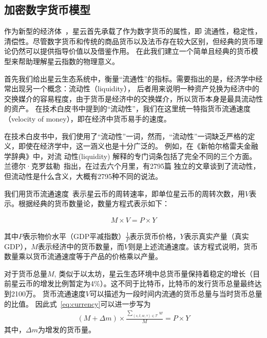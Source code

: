 \subsection{加密数字货币模型}

作为新型的经济体~\cite{neweco}，星云首先承载了作为数字货币的属性，即{\color{red} 流通性，稳定性，清偿性}。尽管数字货币和传统的商品货币以及法币存在较大区别，但经典的货币理论仍然可以提供指导价值以及借鉴作用。
在此我们建立一个简单且经典的货币模型来帮助理解星云指数的物理意义。

首先我们给出星云生态系统中，衡量“流通性”的指标。需要指出的是，经济学中经常出现另一个概念：流动性（liquidity），
后者用来说明一种资产兑换为经济中的交换媒介的容易程度，由于货币是经济中的交换媒介，所以货币本身是最具流动性的资产。
在技术白皮书中提到的“流动性”，我们在这里统一特指货币流通速度（velocity of money），即在经济中货币易手的速度。

{\color{gray} 在技术白皮书中，我们使用了``流动性''一词，然而，``流动性''一词缺乏严格的定义，即使在经济学中，这一涵义也是十分广泛的。
例如，在《新帕尔格雷夫金融学辞典》中，对流
动性(liquidity) 解释的专门词条包括了完全不同的三个方面。兰德尔·克罗兹勒~\cite{randall}指出，在过去六个月里，有2795篇
独立的文章谈到了流动性，但流动性是什么含义，大概有2795种不同的说法。}


我们用货币流通速度~\cite{selden}表示星云币的周转速率，即单位星云币的周转次数，用$V$表示。根据经典的货币数量论，数量方程式表示如下：

\begin{align}
M\times V=P\times Y
\label{eq:currency}
\end{align}

其中$P$表示物价水平（GDP平减指数）$\frac{1}{P}$表示货币价格，$Y$表示真实产量（真实GDP），$M$表示经济中的货币数量，而$V$则是上述流通速度。该方程式说明，货币数量乘以货币流通速度等于产品的价格乘以产量。


对于货币总量$M$, 类似于以太坊，星云生态环境中总货币量保持着稳定的增长（目前星云币的增发比例暂定为4\%）。这不同于比特币，比特币的发行货币总量最终达到2100万。
货币流通速度$V$可以描述为一段时间内流通的货币总量与当时货币总量的比值。
因此式~\ref{eq:currency}可以进一步写为
\begin{align}
(M + \Delta{m}) \times \frac{\sum_{(s, t, w, \tau)\in \mathcal{T}}{w}}{M} = P \times Y
\label{eq:cur_ext}
\end{align}
\noindent 其中，$\Delta{m}$为增发的货币量。

